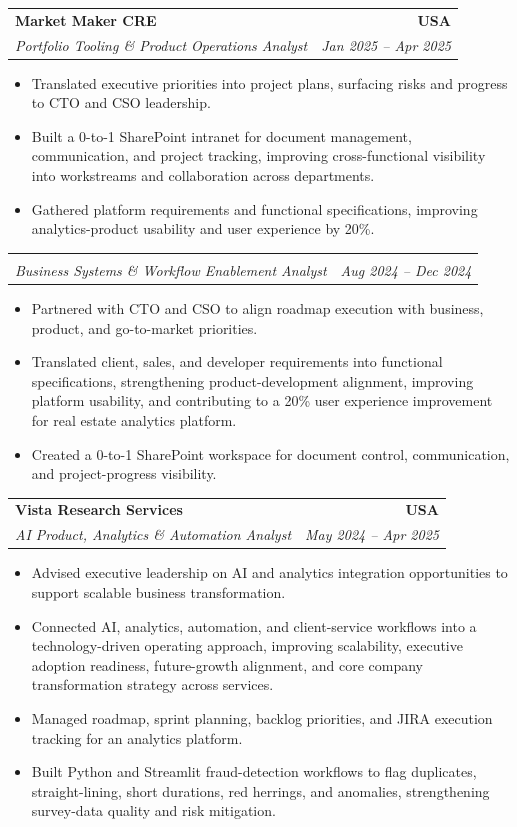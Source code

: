 \documentclass[letterpaper,10pt]{article}
\makeatletter
\newcommand{\resumeItem}[1]{\item \small{#1}}
\newcommand{\resumeSubheading}[4]{
  \vspace{1pt}\item
    \begin{tabular*}{1.0\textwidth}[t]{l@{\extracolsep{\fill}}r}
      \textbf{#1} & \textbf{\small #2} \\
      \textit{\small #3} & \textit{\small #4} \\
    \end{tabular*}\vspace{-6pt}
}
\newcommand{\resumeItemListStart}{\begin{itemize}[leftmargin=0.15in, itemsep=1pt, topsep=3pt]}
\newcommand{\resumeItemListEnd}{\end{itemize}\vspace{-2pt}}
\makeatother
\begin{document}
\vspace{-2pt}

\resumeSubheading
{Market Maker CRE}{USA}
{Portfolio Tooling \& Product Operations Analyst}{Jan 2025 -- Apr 2025}
\resumeItemListStart
\resumeItem{Translated executive priorities into project plans, surfacing risks and progress to CTO and CSO leadership.}
\resumeItem{Built a 0-to-1 SharePoint intranet for document management, communication, and project tracking, improving cross-functional visibility into workstreams and collaboration across departments.}
\resumeItem{Gathered platform requirements and functional specifications, improving analytics-product usability and user experience by 20\%.}
\resumeItemListEnd

\vspace{-2pt}

\resumeSubheading
{}{}
{Business Systems \& Workflow Enablement Analyst}{Aug 2024 -- Dec 2024}
\resumeItemListStart
\resumeItem{Partnered with CTO and CSO to align roadmap execution with business, product, and go-to-market priorities.}
\resumeItem{Translated client, sales, and developer requirements into functional specifications, strengthening product-development alignment, improving platform usability, and contributing to a 20\% user experience improvement for real estate analytics platform.}
\resumeItem{Created a 0-to-1 SharePoint workspace for document control, communication, and project-progress visibility.}
\resumeItemListEnd

\vspace{-2pt}

\resumeSubheading
{Vista Research Services}{USA}
{AI Product, Analytics \& Automation Analyst}{May 2024 -- Apr 2025}
\resumeItemListStart
\resumeItem{Advised executive leadership on AI and analytics integration opportunities to support scalable business transformation.}
\resumeItem{Connected AI, analytics, automation, and client-service workflows into a technology-driven operating approach, improving scalability, executive adoption readiness, future-growth alignment, and core company transformation strategy across services.}
\resumeItem{Managed roadmap, sprint planning, backlog priorities, and JIRA execution tracking for an analytics platform.}
\resumeItem{Built Python and Streamlit fraud-detection workflows to flag duplicates, straight-lining, short durations, red herrings, and anomalies, strengthening survey-data quality and risk mitigation.}
\resumeItemListEnd

\vspace{-2pt}
\end{document}
